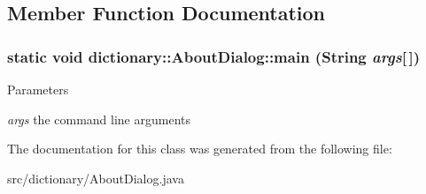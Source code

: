 \subsection{Member Function Documentation}
\hypertarget{classdictionary_1_1_about_dialog_aebd31f4196db2d485279739c43eca53e}{
\subsubsection[{main}]{\setlength{\rightskip}{0pt plus 5cm}static void dictionary::AboutDialog::main (String {\em args}\mbox{[}$\,$\mbox{]})}}
\label{classdictionary_1_1_about_dialog_aebd31f4196db2d485279739c43eca53e}

\begin{DoxyParams}{Parameters}
\item[{\em args}]the command line arguments \end{DoxyParams}


The documentation for this class was generated from the following file:\begin{DoxyCompactItemize}
\item 
src/dictionary/AboutDialog.java\end{DoxyCompactItemize}
